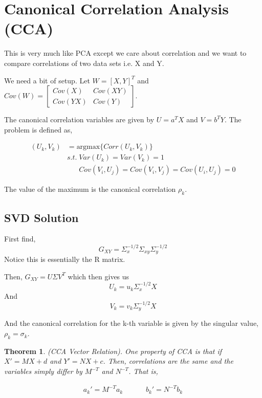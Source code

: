 \documentclass[twoside]{article}
\newcommand\argmax[1]{\text{argmax}#1}
\newtheorem{theorem}{Theorem}[section]
\begin{document}
\section{Canonical Correlation Analysis (CCA)}

This is very much like PCA except we care about correlation and we want to compare correlations of two data sets i.e. X and Y.

We need a bit of setup. Let $W = [X,Y]^T$ and $Cov(W) = \begin{bmatrix}Cov(X)&Cov(XY)\\Cov(YX)&Cov(Y)\end{bmatrix}$.

The canonical correlation variables are given by $U = a^TX$ and $V = b^TY$. The problem is defined as,

\begin{equation}\begin{aligned}(U_k, V_k) &= \argmax\{Corr(U_k,V_k)\} 
\\& s.t. \; Var(U_k) = Var(V_k) = 1
\\& \;\;\;\;\;\; Cov(V_i, U_j) = Cov(V_i, V_j) = Cov(U_i, U_j) = 0\end{aligned}\end{equation}

The value of the maximum is the canonical correlation $\rho_k$.

\subsection{SVD Solution}

First find, 
\begin{equation}G_{XY} = \Sigma_x^{-1/2}\Sigma_{xy}\Sigma_{y}^{-1/2}\label{eq:CCA_G}\end{equation} Notice this is essentially the R matrix.

Then, $G_{XY} = U\Sigma V^T$ which then gives us 
$$U_k = u_k\Sigma_x^{-1/2}X$$
And 
$$V_k = v_k\Sigma_y^{-1/2}X$$

And the canonical correlation for the k-th variable is given by the singular value, $\rho_k = \sigma_k$.
\begin{theorem}(CCA Vector Relation).
One property of CCA is that if $X'=MX+d$ and $Y' = NX+c$. Then, correlations are the same and the variables simply differ by $M^{-T}$ and $N^{-T}$. That is,

$$\begin{aligned}a_k' = M^{-T}a_k && && b_k' = N^{-T}b_k\end{aligned}$$

\end{theorem}
\end{document}

